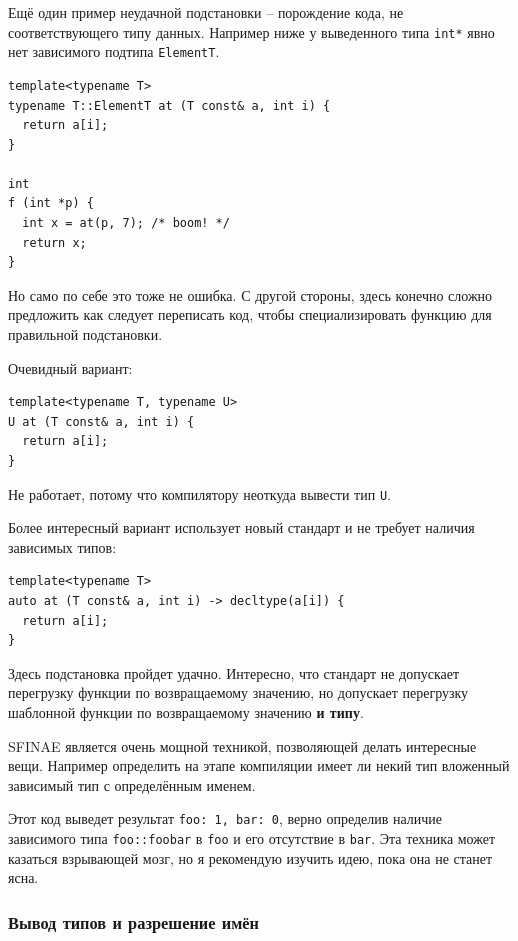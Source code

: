 \documentclass[a4paper,12pt,oneside]{article}
\begin{document}
Ещё один пример неудачной подстановки -- порождение кода, не соответствующего типу данных. Например ниже у выведенного типа \lstinline!int*! явно нет зависимого подтипа \lstinline!ElementT!.

\begin{lstlisting}
template<typename T>
typename T::ElementT at (T const& a, int i) {
  return a[i];
}

int
f (int *p) {
  int x = at(p, 7); /* boom! */
  return x;
}
\end{lstlisting}

Но само по себе это тоже не ошибка. С другой стороны, здесь конечно сложно предложить как следует переписать код, чтобы специализировать функцию для правильной подстановки. 

Очевидный вариант:

\begin{lstlisting}
template<typename T, typename U>
U at (T const& a, int i) {
  return a[i];
}
\end{lstlisting}

Не работает, потому что компилятору неоткуда вывести тип \lstinline!U!.

Более интересный вариант использует новый стандарт и не требует наличия зависимых типов:

\begin{lstlisting}
template<typename T>
auto at (T const& a, int i) -> decltype(a[i]) {
  return a[i];
}
\end{lstlisting}

Здесь подстановка пройдет удачно. Интересно, что стандарт не допускает перегрузку функции по возвращаемому значению, но допускает перегрузку шаблонной функции по возвращаемому значению \textbf{и типу}.

SFINAE является очень мощной техникой, позволяющей делать интересные вещи. Например определить на этапе компиляции имеет ли некий тип вложенный зависимый тип с определённым именем.



Этот код выведет результат \lstinline!foo: 1, bar: 0!, верно определив наличие зависимого типа \lstinline!foo::foobar! в \lstinline!foo! и его отсутствие в \lstinline!bar!. Эта техника может казаться взрывающей мозг, но я рекомендую изучить идею, пока она не станет ясна.

\subsubsection{Вывод типов и разрешение имён}\label{TemplateInference}
\end{document}
